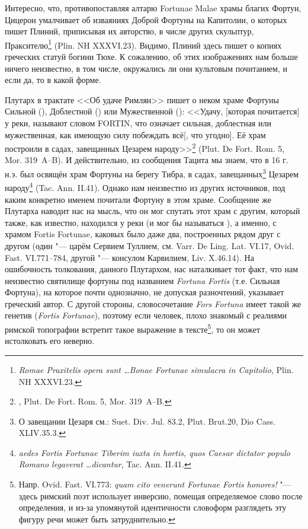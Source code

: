 Интересно, что, противопоставляя алтарю Fortunae Malae храмы благих Фортун, Цицерон умалчивает об изваяниях Доброй Фортуны на Капитолии, о которых пишет Плиний, приписывая их авторство, в числе других скульптур, Праксителю\footnote{\textit{Romae Praxitelis opera sunt \ldots Bonae Fortunae simulacra in Capitolio}, Plin. NH XXXVI.23.} (Plin. NH XXXVI.23). Видимо, Плиний здесь пишет о копиях греческих статуй богини Тюхе. К сожалению, об этих изображениях нам больше ничего неизвестно, в том числе, окружались ли они культовым почитанием, и если да, то в какой форме.

Плутарх в трактате <<Об удаче Римлян>> пишет о неком храме Фортуны Сильной (), Доблестной () или Мужественной (): <<Удачу, [которая почитается] у реки, называют словом FORTIN, что означает сильная, доблестная или мужественная, как имеющую силу побеждать всё[, что угодно]. Её храм построили в садах, завещанных Цезарем народу>>\footnote{, Plut. De Fort. Rom. 5, Mor. 319~A--B.} (Plut. De Fort. Rom. 5, Mor. 319~A--B). И действительно, из сообщения Тацита мы знаем, что в 16 г. н.э. был освящён храм Фортуны на берегу Тибра, в садах, завещанных\footnote{О завещании Цезаря см.: Suet. Div. Jul. 83.2, Plut. Brut.20, Dio Cass. XLIV.35.3.} Цезарем народу\footnote{\textit{aedes Fortis Fortunae Tiberim iuxta in hortis, quos Caesar dictator populo Romano legaverat \ldots dicantur}, Tac. Ann. II.41.} (Tac. Ann. II.41). Однако нам неизвестно из других источников, под каким конкретно именем почитали Фортуну в этом храме. Сообщение же Плутарха наводит нас на мысль, что он мог спутать этот храм с другим, который также, как известно, находился у реки (и мог бы называться ), а именно, с храмом Fortis Fortunae, каковых было даже два, построенных рядом друг с другом (один "--- царём Сервием Туллием, см. Varr. De Ling. Lat. VI.17, Ovid. Fast. VI.771--784, другой "--- консулом Карвилием, Liv. X.46.14). На ошибочность толкования, данного Плутархом, нас наталкивает тот факт, что нам неизвестно святилище фортуны под названием \textit{Fortuna Fortis} (т.е. Сильная Фортуна), на которое почти однозначно, не допуская разночтений, указывает греческий автор. С другой стороны, словосочетание \textit{Fors Fortuna} имеет такой же генетив (\textit{Fortis Fortunae}), поэтому если человек, плохо знакомый с реалиями римской топографии встретит такое выражение в тексте\footnote{Напр. Ovid. Fast. VI.773: \textit{quam cito venerunt Fortunae Fortis honores!} "--- здесь римский поэт использует инверсию, помещая определяемое слово после определения, и из-за упомянутой идентичности словоформ разглядеть эту фигуру речи может быть затруднительно.}, то он может истолковать его неверно.

